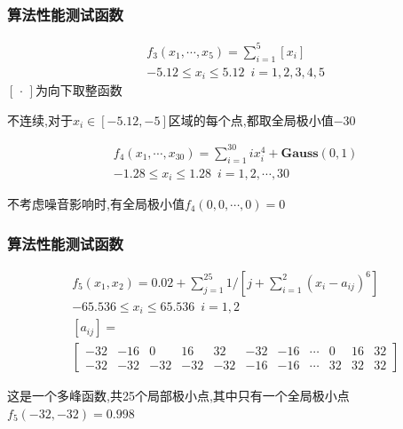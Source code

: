 \documentclass{beamer}
\begin{document}
	\begin{frame}
		\frametitle{算法性能测试函数}
	\begin{definition}
		\begin{eqnarray*}
			&f_3(x_1,\cdots,x_5)=\sum_{i=1}^{5}[x_i]\\
			&-5.12\le x_i \le 5.12 \,\,\,i=1,2,3,4,5		
		\end{eqnarray*}
		$[\,\cdot \,]$为向下取整函数
	\end{definition}
不连续,对于$x_i\in [-5.12,-5]$区域的每个点,都取全局极小值$-30$
		\begin{definition}
			\begin{eqnarray*}
				&f_4(x_1,\cdots,x_{30})=\sum_{i=1}^{30} ix_i^4 +\textbf{Gauss}(0,1)\\
				&-1.28\le x_i \le 1.28 \,\,\,i=1,2,\cdots,30
			\end{eqnarray*}
		\end{definition}
	不考虑噪音影响时,有全局极小值$f_4(0,0,\cdots,0)=0$
	\end{frame}
	\begin{frame}
		\frametitle{算法性能测试函数}
	\begin{definition}
		\begin{eqnarray*}
			&f_5(x_1,x_2)=0.02+\sum_{j=1}^{25} 1/[j+\sum_{i=1}^{2} (x_i-a_{ij})^6]\\
			&-65.536\le x_i \le 65.536 \,\,\,i=1,2 \\
			&[a_{ij}]=\\
			&\left[
				\begin{array}{ccccccccccc}
					-32 & -16 & 0 & 16 & 32 & -32 & -16 & \cdots &0 & 16 & 32\\
					-32 & -32  & -32 & -32 & -32 & -16& -16 & \cdots & 32& 32& 32
				\end{array}
			\right]
		\end{eqnarray*}
	\end{definition}
	这是一个多峰函数,共25个局部极小点,其中只有一个全局极小点$f_5(-32,-32)=0.998$
		
	
	\end{frame}
\end{document}
